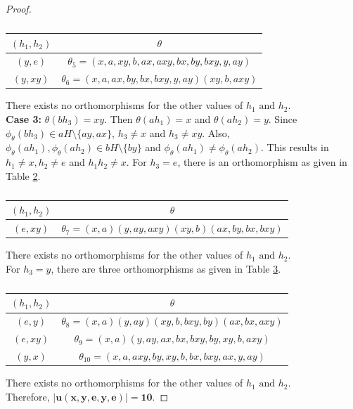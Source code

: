 \documentclass[11pt,a4paper]{article}
\theoremstyle{definition}
\theoremstyle{remark}
\begin{document}
\begin{proof}
\begin{table}[H]
		\begin{center}
			\begin{tabular}{|c|c|}
			\hline
			$(h_{1},h_{2})$ & $\theta$\\ \hline
			$(y,e)$ & $ \theta_{5}=(x,a,xy,b,ax,axy,bx,by,bxy,y,ay)$ \\ \hline
			$(y,xy)$ & $\theta_{6}=(x,a,ax,by,bx,bxy,y,ay)(xy,b,axy)$ \\ \hline
		\end{tabular}\caption{} \label{t6}
		\end{center}
	\end{table}
	\vspace{-.7cm}
		There exists no orthomorphisms for the other values of $h_{1} \text{ and } h_{2}$.\\
	\textbf{Case 3:}  $\theta(bh_{3}) = xy.$ Then $\theta(ah_{1}) = x$ and $\theta(ah_{2}) = y$. Since $\phi_{\theta}(bh_{3}) \in aH \setminus \{ay,ax\}$, $h_{3} \neq x$ and $h_{3} \neq xy$. Also, $\phi_{\theta}(ah_{1}), \phi_{\theta}(ah_{2}) \in bH\setminus \{by\}$ and $\phi_{\theta}(ah_{1}) \neq \phi_{\theta}(ah_{2})$. This results in $h_{1} \neq x, h_{2} \neq e$ and $h_{1}h_{2} \neq x$. For $h_{3} = e$, there is an orthomorphism as given in Table \ref{t7}.
	\begin{table}[H]
		\begin{center}
			\begin{tabular}{|c|c|}
			\hline
			$(h_{1},h_{2})$ & $\theta$\\ \hline
			$(e,xy)$ &  $\theta_{7} = (x,a)(y,ay,axy)(xy,b)(ax,by,bx,bxy)$ \\ \hline
		\end{tabular}\caption{} \label{t7}
		\end{center}
	\end{table}
	\vspace{-.7cm}
	There exists no orthomorphisms for the other values of $h_{1} \text{ and } h_{2}$.\\
	For $h_{3} = y$, there are three orthomorphisms as given in Table \ref{t8}. 
	\begin{table}[H]
		\begin{center}
			\begin{tabular}{|c|c|}
			\hline
			$(h_{1},h_{2})$ & $\theta$\\ \hline
			$(e,y)$ &  $\theta_{8} = (x,a)(y,ay)(xy,b,bxy,by)(ax,bx,axy)$ \\ \hline
			$(e,xy)$ & $\theta_{9} = (x,a)(y,ay,ax,bx,bxy,by,xy,b,axy)$\\ \hline
			$(y,x)$ & $\theta_{10} = (x,a,axy,by,xy,b,bx,bxy,ax,y,ay)$ \\ \hline
		\end{tabular}\caption{}\label{t8}
		\end{center}
	\end{table}
	\vspace{-.7cm}
	There exists no orthomorphisms for the other values of $h_{1} \text{ and } h_{2}$.\\
	Therefore, $\bm{\vert u(x,y,e,y,e) \vert = 10}$.
\end{proof}
\end{document}
